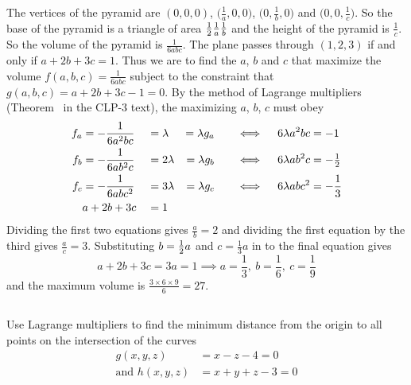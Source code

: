 \begin{solution}
The vertices of the pyramid are $(0,0,0)$, 
$\big(\frac{1}{a},0,0\big)$, $\big(0, \frac{1}{b},0\big)$ and
$\big(0,0,\frac{1}{c}\big)$. So the base of the pyramid is a triangle
of area $\tfrac{1}{2}\frac{1}{a}\frac{1}{b}$ and the height of the pyramid is
$\frac{1}{c}$. So the volume of the pyramid is $\frac{1}{6abc}$.
The plane passes through $(1,2,3)$ if and only if $a+2b+3c=1$. 
Thus we are to find the $a$, $b$ and $c$ that maximize the volume 
$f(a,b,c)=\frac{1}{6abc}$ subject to the constraint that 
$g(a,b,c)=a+2b+3c-1=0$. 
By the method of Lagrange multipliers (Theorem~ 
in the CLP-3 text), the maximizing $a$, $b$, $c$ must obey
\begin{alignat*}{5}
f_a&=-\frac{1}{6a^2bc}&&=\lambda&=\lambda g_a\quad &&\iff\quad 6\lambda a^2bc&=-1 \\
f_b&=-\frac{1}{6ab^2c}&&=2\lambda&=\lambda g_b\quad&&\iff\quad 6\lambda ab^2c&=-\tfrac{1}{2} \\
f_c&=-\frac{1}{6abc^2}&&=3\lambda&=\lambda g_c\quad      &&\iff\quad 
                                     6\lambda abc^2&=-\frac{1}{3}\\
    &a+2b+3c&&=1
\end{alignat*}
Dividing the first two equations gives $\frac{a}{b}=2$
and dividing the first equation by the third gives $\frac{a}{c}=3$.
Substituting $b=\tfrac{1}{2} a$ and $c=\frac{1}{3} a$ in to the final equation gives
\begin{equation*}
a+2b+3c=3a=1  %
\implies a=\frac{1}{3},\ b=\frac{1}{6},\ c=\frac{1}{9}
\end{equation*}
and the maximum volume is $\frac{3\times 6\times 9}{6}=27$.
\end{solution}

\subsection*{\Application}

\begin{question}[M200 2009D] %
Use Lagrange multipliers to find the minimum distance from the origin 
to all points on the intersection of the curves
\begin{align*}
            g(x,y,z) &= x-z-4=0 \\
\text{and } h(x,y,z) &= x+y+z-3=0
\end{align*}
\end{question}

